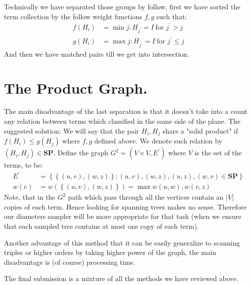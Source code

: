 \documentclass{article}
\begin{document}
\begin{multicols}{2}
Technically we have separated those groups by follow, first we have sorted the term collection by the follow weight functions \(f,g\) such that:
\begin{equation*}
    \begin{split}
        f\left(H_{i}\right) &= \min {j : H_{j^{\prime}} = I \ \text{for } j^{\prime} > j } \\
        g\left(H_{i}\right) &= \max {j : H_{j^{\prime}} = I \ \text{for } j^{\prime} \le j }
    \end{split}
\end{equation*}    
And then we have matched pairs till we get into intersection.  
\section{The Product Graph.}
The main disadvantage of the last separation is that it doesn't take into a count any relation between terms which classified in the same side of the plane. The suggested solution: We will say that the pair \(H_i, H_j\) share a "solid product" if  \( f\left(H_{i}\right) \le g \left(H_{j}\right) \) where \(f,g\) defined above. We denote such relation by \(\left(H_i, H_j\right) \in \textbf{SP} \). Define the graph \(G^2 = \left(V\times V , E^{\prime}\right)\) where \(V\) is the set of the terms, to be: 
\begin{equation*}
    \begin{split}
        E^{\prime} &= \left\{ \left\{ (u,v),(w,z) \right\} : (u,v),(w,z),(u,z),(w,v) \in \textbf{SP} \right\}  \\
        w(e) &= w\left( \left\{ (u,v),(w,z) \right\} \right) = \max { w(u,w),w(v,z) }
    \end{split}
\end{equation*}
Note, that in the \(G^2\) path which pass through all the vertices contain an \(|V|\) copies of each term. Hence looking for spanning trees makes no sense. Therefore our diameters sampler will be more appropriate for that task (when we ensure that each sampled tree contains at most one copy of each term).          

Another advantage of this method that it can be easily generalize to scanning triples or higher orders by taking higher power of the graph, the main disadvantage is (of course) processing time.       

The final submission is a mixture of all the methods we have reviewed above.   

\printbibliography 
\end{multicols}


\end{document}
